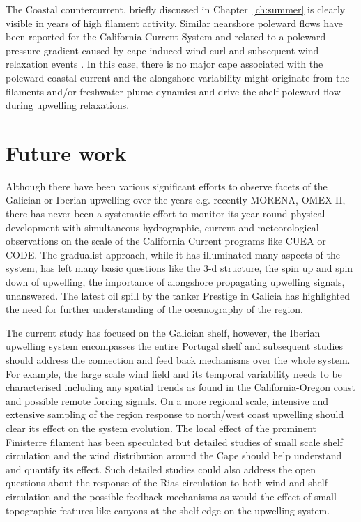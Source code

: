 The Coastal countercurrent, briefly discussed in
Chapter~\ref{ch:summer} is clearly visible in years of high
filament activity. Similar nearshore poleward flows have been
reported for the California Current System \citep[e.g.][]{Send87}
and related to a poleward pressure gradient caused by cape induced
wind-curl and subsequent wind relaxation events \citep{Wang97}. In
this case, there is no major cape associated with the poleward
coastal current and the alongshore variability might originate
from the filaments and/or freshwater plume dynamics
\citep[e.g.][]{Peliz02} and drive the shelf poleward flow during
upwelling relaxations.

\section{Future work}
Although there have been various significant efforts to observe
facets of the Galician or Iberian upwelling over the years e.g.
recently MORENA, OMEX II, there has never been a systematic effort
to monitor its year-round physical development with simultaneous
hydrographic, current and meteorological observations on the scale
of the California Current programs like CUEA or CODE. The
gradualist approach, while it has illuminated many aspects of the
system, has left many basic questions like the 3-d structure, the
spin up and spin down of upwelling, the importance of alongshore
propagating upwelling signals, unanswered. The latest oil spill by
the tanker Prestige in Galicia has highlighted the need for
further understanding of the oceanography of the region.

The current study has focused on the Galician shelf, however, the
Iberian upwelling system encompasses the entire Portugal shelf and
subsequent studies should address the connection and feed back
mechanisms over the whole system. For example, the large scale
wind field and its temporal variability needs to be characterised
including any spatial trends as found in the California-Oregon
coast and possible remote forcing signals. On a more regional
scale, intensive and extensive sampling of the region response to
north/west coast upwelling should clear its effect on the system
evolution. The local effect of the prominent Finisterre filament
has been speculated but detailed studies of small scale shelf
circulation and the wind distribution around the Cape should help
understand and quantify its effect. Such detailed studies could
also address the open questions about the response of the Rias
circulation to both wind and shelf circulation and the possible
feedback mechanisms as would the effect of small topographic
features like canyons at the shelf edge on the upwelling system.

